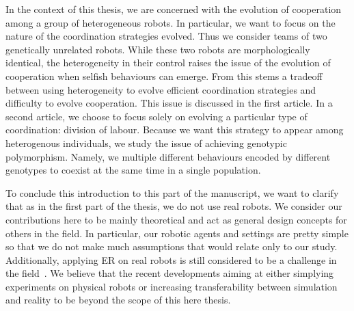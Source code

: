     In the context of this thesis, we are concerned with the evolution of cooperation among a group of heterogeneous robots. In particular, we want to focus on the nature of the coordination strategies evolved. Thus we consider teams of two genetically unrelated robots. While these two robots are morphologically identical, the heterogeneity in their control raises the issue of the evolution of cooperation when selfish behaviours can emerge. From this stems a tradeoff between using heterogeneity to evolve efficient coordination strategies and difficulty to evolve cooperation. This issue is discussed in the first article. In a second article, we choose to focus solely on evolving a particular type of coordination: division of labour. Because we want this strategy to appear among heterogenous individuals, we study the issue of achieving genotypic polymorphism. Namely, we multiple different behaviours encoded by different genotypes to coexist at the same time in a single population.

    To conclude this introduction to this part of the manuscript, we want to clarify that as in the first part of the thesis, we do not use real robots. We consider our contributions here to be mainly theoretical and act as general design concepts for others in the field. In particular, our robotic agents and settings are pretty simple so that we do not make much assumptions that would relate only to our study. Additionally, applying ER on real robots is still considered to be a challenge in the field~\parencite{Floreano2008, Doncieux2015a}. We believe that the recent developments aiming at either simplying experiments on physical robots or increasing transferability between simulation and reality to be beyond the scope of this here thesis. 


